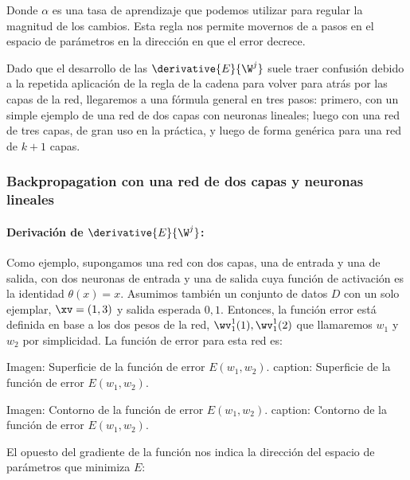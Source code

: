 Donde $\alpha$ es una tasa de aprendizaje que podemos utilizar para regular la magnitud de los cambios. Esta regla nos permite movernos de a pasos en el espacio de parámetros en la dirección en que el error decrece. 


Dado que el desarrollo de las $\derivative{E}{\W^j}$ suele traer confusión debido a la repetida aplicación de la regla de la cadena para volver para atrás por las capas de la red, llegaremos a una fórmula general en tres pasos: primero, con un simple ejemplo de una red de dos capas con neuronas lineales; luego con una red de tres capas, de gran uso en la práctica, y luego de forma genérica para una red de $k+1$ capas.

\subsubsection{Backpropagation con una red de dos capas y neuronas lineales} 


\paragraph{Derivación de $\derivative{E}{\W^j}$:}
Como ejemplo, supongamos una red con dos capas, una de entrada y una de salida, con dos neuronas de entrada y una de salida cuya función de activación es la identidad $\theta(x)=x$. Asumimos también un conjunto de datos $D$ con un solo ejemplar, $\xv=(1,3)$ y salida esperada $0,1$. Entonces, la función error está definida en base a los dos pesos de la red, $\wv_1^1(1),\wv_1^1(2)$ que llamaremos $w_1$ y $w_2$ por simplicidad. La función de error para esta red es:


Imagen: Superficie de la función de error $E(w_1,w_2)$.
caption: Superficie de la función de error $E(w_1,w_2)$.



Imagen: Contorno de la función de error $E(w_1,w_2)$.
caption: Contorno de la función de error $E(w_1,w_2)$.


El opuesto del gradiente de la función nos indica la dirección del espacio de parámetros que minimiza $E$:



